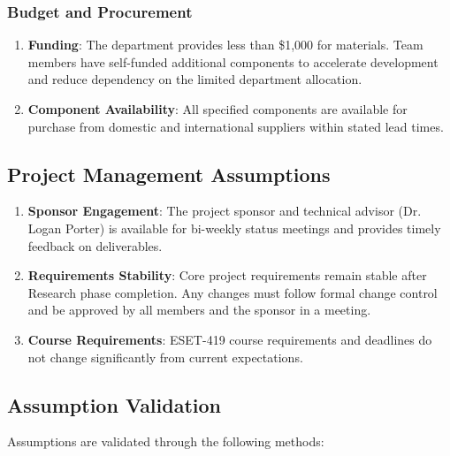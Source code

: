 \subsubsection{Budget and Procurement}

\begin{enumerate}
    \item \textbf{Funding}: The department provides less than \$1,000 for materials. Team members have self-funded additional components to accelerate development and reduce dependency on the limited department allocation.

    \item \textbf{Component Availability}: All specified components are available for purchase from domestic and international suppliers within stated lead times.
\end{enumerate}

\subsection{Project Management Assumptions}

\begin{enumerate}
    \item \textbf{Sponsor Engagement}: The project sponsor and technical advisor (Dr. Logan Porter) is available for bi-weekly status meetings and provides timely feedback on deliverables.

    \item \textbf{Requirements Stability}: Core project requirements remain stable after Research phase completion. Any changes must follow formal change control and be approved by all members and the sponsor in a meeting.

    \item \textbf{Course Requirements}: ESET-419 course requirements and deadlines do not change significantly from current expectations.
\end{enumerate}

\subsection{Assumption Validation}

Assumptions are validated through the following methods:

